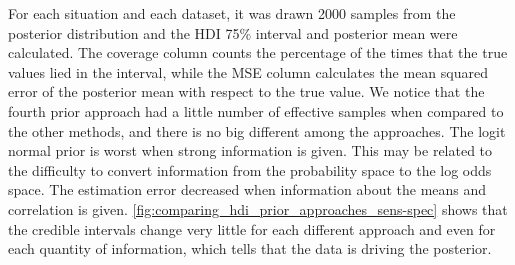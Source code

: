 For each situation and each dataset, it was drawn 2000 samples from the
posterior distribution and the HDI 75\% interval and posterior mean were calculated. The coverage
column counts the percentage of the times that the true values lied in the
interval, while the MSE column calculates the mean squared error of the
posterior mean with respect to the true value. We notice that the fourth prior
approach had a little number of effective samples when compared to the other
methods, and there is no big different among the approaches. The
logit normal prior is worst when strong information is given. This may be
related to the difficulty to convert information from the probability space to
the log odds space. The estimation error decreased when information about the
means and correlation is given.
\autoref{fig:comparing_hdi_prior_approaches_sens-spec}
shows that the credible intervals change very little for each different
approach and even for each quantity of information, which tells that the data
is driving the posterior.

